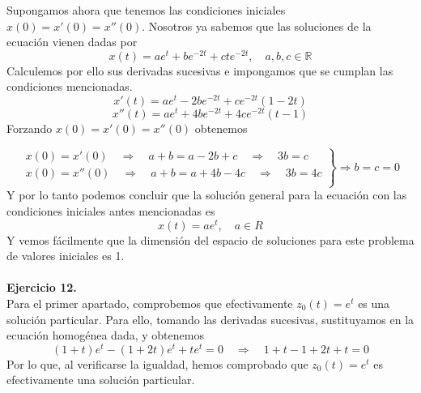 \documentclass[fleqn]{article}
\def\R{\mathds{R}}
\begin{document}
    Supongamos ahora que tenemos las condiciones iniciales $x(0) = x'(0) = x''(0)$. Nosotros ya sabemos que las soluciones de la ecuación vienen dadas por 
    $$x(t)= ae^t + be^{-2t} + cte^{-2t}, \quad a,b,c \in \R$$
    Calculemos por ello sus derivadas sucesivas e impongamos que se cumplan las condiciones mencionadas.
    $$x'(t)= ae^t -2be^{-2t} + ce^{-2t}(1-2t)$$
    $$x''(t)= ae^t + 4be^{-2t} + 4ce^{-2t}(t-1)$$
    Forzando $x(0) = x'(0) = x''(0)$ obtenemos

    \begin{equation*}
        \left.
        \begin{aligned}
            x(0) = x'(0)\quad \Rightarrow \quad a+b=a-2b+c\quad \Rightarrow \quad 3b = c\\
            x(0) = x''(0)\quad \Rightarrow \quad a+b=a+4b-4c\quad \Rightarrow \quad 3b = 4c\\
        \end{aligned}
        \right\} \Rightarrow b=c=0
    \end{equation*}
    Y por lo tanto podemos concluir que la solución general para la ecuación con las condiciones iniciales antes mencionadas es 
    $$x(t) = ae^t, \quad a\in R$$
    Y vemos fácilmente que la dimensión del espacio de soluciones para este problema de valores iniciales es 1.\\ \\

    \textbf{Ejercicio 12.} \\

    Para el primer apartado, comprobemos que efectivamente $z_0(t) = e^t$ es una solución particular. Para ello, tomando las derivadas sucesivas, sustituyamos en la ecuación homogénea
    dada, y obtenemos
    $$(1+t)e^t - (1+2t)e^t + te^t = 0 \quad \Rightarrow \quad 1+t - 1+2t + t = 0$$
    Por lo que, al verificarse la igualdad, hemos comprobado que $z_0(t) = e^t$ es efectivamente una solución particular.
\end{document}
